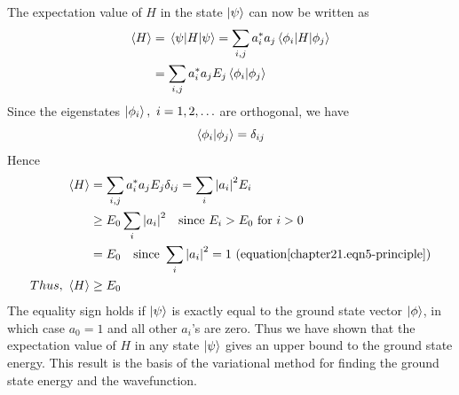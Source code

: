	The expectation value of $H$ in the state $\ket{\psi}$ can now be written as 
	\begin{align*}
		\expval{H} &= \expval{H}{\psi} = \sum_{i,j} a^*_i a_j \mel{\phi_i}{H}{\phi_j}\\
		&=  \sum_{i,j} a^*_i a_j E_j \braket{\phi_i}{\phi_j}
	\end{align*}
	Since the eigenstates $\ket{\phi_i},\ i=1,2,\ldots$ are orthogonal, we have
	\begin{equation*}
		\braket{\phi_i}{\phi_j} = \delta_{i j}
	\end{equation*}
	Hence
	\begin{align*}
		\expval{H} &= \sum_{i,j} a^*_i a_j E_j \delta_{i j} = \sum_{i} \abs{a_i}^2 E_i \\
		&\geq E_0 \sum_{i} \abs{a_i}^2 \quad \text{since } E_i > E_0 \ \text{for} \ i>0 \\
		&= E_0 \quad \text{since } \sum_{i} \abs{a_i}^2=1 \  (\text{equation} \ref{chapter21.eqn5-principle})\\
		Thus, \ \expval{H} &\geq E_0
	\end{align*}
	The equality sign holds if $\ket{\psi}$ is exactly equal to the ground state vector $\ket{\phi}$, in which case $a_0=1$ and all other $a_i$'s are zero. Thus we have shown that the expectation value of $H$ in any state $\ket{\psi}$ gives an upper bound to the ground state energy. This result is the basis of the variational method for finding the ground state energy and the wavefunction.\\
	
